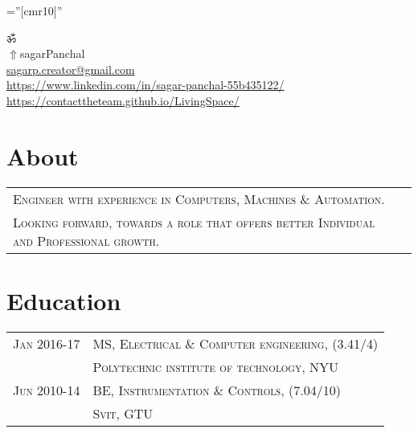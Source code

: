 \documentclass[a4paper]{article}
\begin{document}
\pagestyle{empty} 						%
\font\fb=''[cmr10]'' 						%

\par	{\centering
	ॐ																																\\
	\href{https://contacttheteam.github.io/LivingSpace/}{$ \Uparrow$}{sagarPanchal}																																\\
	\small \href{mailto:sagarp.creator@gmail.com}{sagarp.creator@gmail.com}																						\\
	\small \href{https://www.linkedin.com/in/sagar-panchal-55b435122/}{https://www.linkedin.com/in/sagar-panchal-55b435122/}		\textbullet \href{https://contacttheteam.github.io/LivingSpace/}{https://contacttheteam.github.io/LivingSpace/}		\par}
	
\section	{	About		}
	\begin{tabular}{ll}
		\textsc{	Engineer with experience in Computers,  Machines \& Automation.					}\\
		\textsc{	Looking forward,  towards a role that offers better Individual and Professional growth.	}
	\\\end{tabular}



\section	{	Education		}
	\begin{tabular}{rl}
		\small{}\textsc{		Jan 2016-17	} 		& 		\textsc{	MS, Electrical \& Computer engineering, 		\small {(3.41/4)}			}	\\
 											& 		\textsc{	Polytechnic institute of technology, NYU							}	\\
 		\small{}\textsc{		Jun 2010-14	} 		& 		\textsc{	BE, Instrumentation \small{\&} Controls,		\small {(7.04/10)}		}	\\
 											& 		\textsc{	Svit, GTU													}	\\
	\end{tabular}
\end{document}
